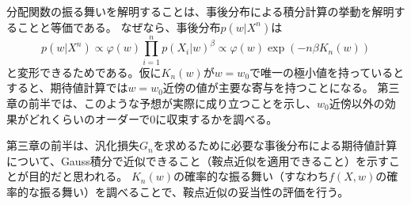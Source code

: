 \documentclass[dvipdfmx]{jsarticle}
\begin{document}
\begin{mybox}[事後分布による期待値計算と分配関数]
    分配関数の振る舞いを解明することは、事後分布による積分計算の挙動を解明することと等価である。
    なぜなら、事後分布$p(w|X^n)$は
    \begin{equation}
        p(w|X^n) \propto \varphi(w)\prod_{i=1}^{n}p(X_i|w)^{\beta} \propto \varphi(w)\exp(-n\beta K_n(w))
    \end{equation}
    と変形できるためである。仮に$K_n(w)$が$w=w_0$で唯一の極小値を持っているとすると、期待値計算では$w=w_0$近傍の値が主要な寄与を持つことになる。
    第三章の前半では、このような予想が実際に成り立つことを示し、$w_0$近傍以外の効果がどれくらいのオーダーで$0$に収束するかを調べる。
\end{mybox}

第三章の前半は、汎化損失$G_n$を求めるために必要な事後分布による期待値計算について、Gauss積分で近似できること（鞍点近似を適用できること）を示すことが目的だと思われる。
$K_n(w)$の確率的な振る舞い（すなわち$f(X, w)$の確率的な振る舞い）を調べることで、鞍点近似の妥当性の評価を行う。
\end{document}
